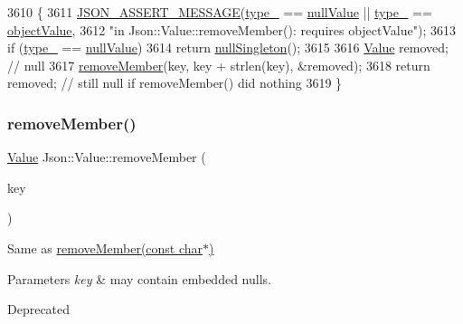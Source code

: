 \begin{DoxyCode}
3610 \{
3611   \hyperlink{json_8h_ad7facdeeca0f495765e3b204c265eadb}{JSON\_ASSERT\_MESSAGE}(\hyperlink{class_json_1_1_value_abd222c2536dc88bf330dedcd076d2356}{type\_} == \hyperlink{namespace_json_a7d654b75c16a57007925868e38212b4ea7d9899633b4409bd3fc107e6737f8391}{nullValue} || 
      \hyperlink{class_json_1_1_value_abd222c2536dc88bf330dedcd076d2356}{type\_} == \hyperlink{namespace_json_a7d654b75c16a57007925868e38212b4eae8386dcfc36d1ae897745f7b4f77a1f6}{objectValue},
3612                       \textcolor{stringliteral}{"in Json::Value::removeMember(): requires objectValue"});
3613   \textcolor{keywordflow}{if} (\hyperlink{class_json_1_1_value_abd222c2536dc88bf330dedcd076d2356}{type\_} == \hyperlink{namespace_json_a7d654b75c16a57007925868e38212b4ea7d9899633b4409bd3fc107e6737f8391}{nullValue})
3614     \textcolor{keywordflow}{return} \hyperlink{class_json_1_1_value_af2f124567acc35d021a424e53ebdfcab}{nullSingleton}();
3615 
3616   \hyperlink{class_json_1_1_value_ada6ba1369448fb0240bccc36efaa46f7}{Value} removed;  \textcolor{comment}{// null}
3617   \hyperlink{class_json_1_1_value_aa52f7873b95d29627d6e83ba96f69aaa}{removeMember}(key, key + strlen(key), &removed);
3618   \textcolor{keywordflow}{return} removed; \textcolor{comment}{// still null if removeMember() did nothing}
3619 \}
\end{DoxyCode}
\mbox{\label{class_json_1_1_value_a1dfd5d30fbc53fcd9c4955b8b3e7885c}} 
\subsubsection{\texorpdfstring{remove\+Member()}{removeMember()}\hspace{0.1cm}{\footnotesize\ttfamily [2/5]}}
{\footnotesize\ttfamily \hyperlink{class_json_1_1_value}{Value} Json\+::\+Value\+::remove\+Member (\begin{DoxyParamCaption}\item[{const \hyperlink{json_8h_a1e723f95759de062585bc4a8fd3fa4be}{J\+S\+O\+N\+C\+P\+P\+\_\+\+S\+T\+R\+I\+NG} \&}]{key }\end{DoxyParamCaption})}

Same as \hyperlink{class_json_1_1_value_aa52f7873b95d29627d6e83ba96f69aaa}{remove\+Member(const char$\ast$)} 
\begin{DoxyParams}{Parameters}
{\em key} & may contain embedded nulls. \\
\hline
\end{DoxyParams}
\begin{DoxyRefDesc}{Deprecated}
\item[\hyperlink{deprecated__deprecated000002}{Deprecated}]\end{DoxyRefDesc}


